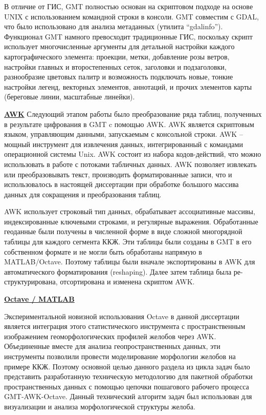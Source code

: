 В отличие от ГИС, GMT полностью основан на скриптовом подходе на основе UNIX с использованием командной строки в консоли. GMT совместим с GDAL, что было использовано для анализа метаданных (утилита “gdalinfo”). Функционал GMT намного превосходит традиционные ГИС, поскольку скрипт использует многочисленные аргументы для детальной настройки каждого картографического элемента: проекции, метки, добавление розы ветров, настройки главных и второстепенных сеток, заголовки и подзаголовки, разнообразие цветовых палитр и возможность подключать новые, тонкие настройки легенд, векторных элементов, аннотаций, и прочих элементов карты (береговые линии, масштабные линейки).

\underline{\textbf{AWK}} 
Следующий этапом работы было преобразование ряда таблиц, полученных в результате цифрования в GMT c помощью AWK. AWK является скриптовым языком, управляющим данными, запускаемым с консольной строки. AWK – мощный инструмент для извлечения данных, интегрированный с командами операционной системы Unix. AWK состоит из набора кодов-действий, что можно использовать в работе с потоками табличных данных. AWK позволяет извлекать или преобразовывать текст, производить форматированные записи, что и использовалось в настоящей диссертации при обработке большого массива данных для сокращения и преобразования таблиц. 

AWK использует строковый тип данных, обрабатывает ассоциативные массивы, индексированные ключевыми строками, и регулярные выражения. Обработанные геоданные были получены в численной форме в виде сложной многорядной таблицы для каждого сегмента ККЖ. Эти таблицы были созданы в GMT в его собственном формате и не могли быть обработаны напрямую в MATLAB/Octave. Поэтому таблицы были вначале экспортированы в AWK для автоматического форматирования (reshaping). Далее затем таблица была ре-структурирована, отсортирована и изменена скриптом AWK.

\underline{\textbf{Octave / MATLAB}} 

Экспериментальной новизной использования Octave в данной диссертации является интеграция этого статистического инструмента с пространственным изображением геоморфологических профилей желобов через AWK. Объединенные вместе для анализа геопространственных данных, эти инструменты позволили провести моделирование морфологии желобов на примере ККЖ. Поэтому основной целью данного раздела из цикла задач было представить разработанную техническую методологию для пакетной обработки пространственных данных с помощью цепочки пошагового рабочего процесса GMT-AWK-Octave. Данный технический алгоритм задач был использован для визуализации и анализа морфологической структуры желоба. 

